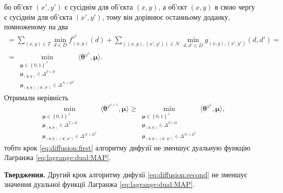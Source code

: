 бо об'єкт $\left(x', y' \right)$ є сусіднім для об'єкта $\left(x, y \right)$,
а об'єкт $\left(x, y \right)$ в свою чергу є сусіднім для об'єкта
$\left(x', y' \right)$, тому він дорівнює останньому доданку, помноженому на два
\begin{equation*}
\begin{gathered}
    = \sum \limits_{\left(x, y \right) \in T}
        \min \limits_{d \in D}
            f_{\left(x, y \right)}^{\varphi^i} \left( d \right) +
    \sum \limits_{\left(\left(x, y \right), \left(x', y' \right) \right) \in \mathcal{N}}
        \min \limits_{d, d' \in D}
            g_{\left(x, y \right), \left(x', y' \right)} \left( d, d' \right) = \\
    = \min \limits_{\substack{\pmb{\mu} \in \left\{ 0, 1 \right\}^{\mathcal{I}} \\
                            \pmb{\mu_{\left(x, y \right)}} \in \Delta^{T \times D} \\
                            \pmb{\mu_{\left(x, y \right), \left(x', y' \right)}} \in
                                \Delta^{\mathcal{N} \times D^2}}}
        \langle \pmb{\theta}^{\varphi^i}, \pmb{\mu} \rangle.
\end{gathered}
\end{equation*}
Отримали нерівність
\begin{equation*}
    \min \limits_{\substack{\pmb{\mu} \in \left\{ 0, 1 \right\}^{\mathcal{I}} \\
                            \pmb{\mu_{\left(x, y \right)}} \in \Delta^{T \times D} \\
                            \pmb{\mu_{\left(x, y \right), \left(x', y' \right)}} \in
                                \Delta^{\mathcal{N} \times D^2}}}
        \langle \pmb{\theta}^{\varphi^{i + 1}}, \pmb{\mu} \rangle \ge
    \min \limits_{\substack{\pmb{\mu} \in \left\{ 0, 1 \right\}^{\mathcal{I}} \\
                            \pmb{\mu_{\left(x, y \right)}} \in \Delta^{T \times D} \\
                            \pmb{\mu_{\left(x, y \right), \left(x', y' \right)}} \in
                                \Delta^{\mathcal{N} \times D^2}}}
        \langle \pmb{\theta}^{\varphi^i}, \pmb{\mu} \rangle,
\end{equation*}
тобто крок \eqref{eq:diffusion:first}
алгоритму дифузії не зменшує дуальную функцію Лагранжа \eqref{eq:lagrange:dual:MAP}.

\textbf{Твердження.}
Другий крок алгоритму дифузії \eqref{eq:diffusion:second}
не зменшує значення дуальної функції Лагранжа \eqref{eq:lagrange:dual:MAP}.

